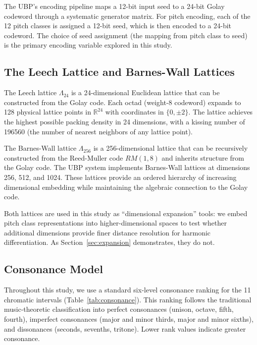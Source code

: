 \documentclass[11pt,a4paper]{article}
\theoremstyle{definition}
\begin{document}
The UBP's encoding pipeline maps a 12-bit input seed to a 24-bit Golay codeword through a systematic generator matrix. For pitch encoding, each of the 12 pitch classes is assigned a 12-bit seed, which is then encoded to a 24-bit codeword. The choice of seed assignment (the mapping from pitch class to seed) is the primary encoding variable explored in this study.

\subsection{The Leech Lattice and Barnes-Wall Lattices}\label{sec:leech_bw}

The Leech lattice $\Lambda_{24}$ is a 24-dimensional Euclidean lattice that can be constructed from the Golay code. Each octad (weight-8 codeword) expands to 128 physical lattice points in $\mathbb{R}^{24}$ with coordinates in $\{0, \pm 2\}$. The lattice achieves the highest possible packing density in 24 dimensions, with a kissing number of 196560 (the number of nearest neighbors of any lattice point).

The Barnes-Wall lattice $\Lambda_{256}$ is a 256-dimensional lattice that can be recursively constructed from the Reed-Muller code $RM(1,8)$ and inherits structure from the Golay code. The UBP system implements Barnes-Wall lattices at dimensions 256, 512, and 1024. These lattices provide an ordered hierarchy of increasing dimensional embedding while maintaining the algebraic connection to the Golay code.

Both lattices are used in this study as ``dimensional expansion'' tools: we embed pitch class representations into higher-dimensional spaces to test whether additional dimensions provide finer distance resolution for harmonic differentiation. As Section~\ref{sec:expansion} demonstrates, they do not.

\subsection{Consonance Model}\label{sec:consonance}

Throughout this study, we use a standard six-level consonance ranking for the 11 chromatic intervals (Table~\ref{tab:consonance}). This ranking follows the traditional music-theoretic classification into perfect consonances (unison, octave, fifth, fourth), imperfect consonances (major and minor thirds, major and minor sixths), and dissonances (seconds, sevenths, tritone). Lower rank values indicate greater consonance.
\end{document}
